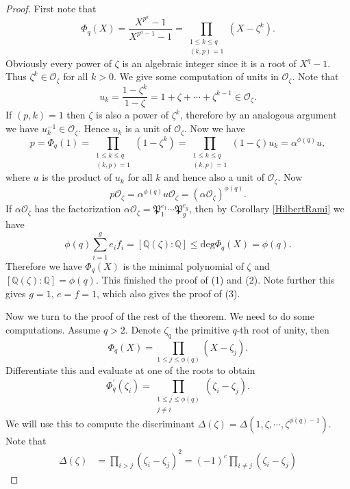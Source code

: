 \begin{proof}
First note that 
$$
\Phi _q\left( X \right) =\frac{X^{p^a}-1}{X^{p^a-1}-1}=\prod_{\substack{1\le k\le q \\ (k,p)=1}}{\left( X-\zeta ^k \right)}.
$$
Obviously every power of $\zeta$ is an algebraic integer since it is a root of $X^q-1$. Thus $\zeta^k\in\mathcal{O}_\zeta$ for all $k>0$. We give some computation of units in $\mathcal{O}_\zeta$. Note that 
$$
u_k=\frac{1-\zeta ^k}{1-\zeta}=1+\zeta +\cdots +\zeta ^{k-1}\in \mathcal{O} _{\zeta}.
$$
If $(p,k)=1$ then $\zeta$ is also a power of $\zeta^k$, therefore by an analogous argument we have $u_k^{-1}\in\mathcal{O}_\zeta$. Hence $u_k$ is a unit of $\mathcal{O}_\zeta$. Now we have 
$$
p=\Phi _q\left( 1 \right) =\prod_{\substack{1\le k\le q \\ (k,p)=1}}{\left( 1-\zeta ^k \right)}=\prod_{\substack{1\le k\le q \\ (k,p)=1}}{\left( 1-\zeta \right) u_k}=\alpha ^{\phi \left( q \right)}u,
$$
where $u$ is the product of $u_k$ for all $k$ and hence also a unit of $\mathcal{O}_\zeta$. Now 
$$
p\mathcal{O} _{\zeta}=\alpha ^{\phi \left( q \right)}u\mathcal{O} _{\zeta}=\left( \alpha \mathcal{O} _{\zeta} \right) ^{\phi \left( q \right)}.
$$
If $\alpha\mathcal{O}_\zeta$ has the factorization $\alpha \mathcal{O} _{\zeta}=\mathfrak{P} _{1}^{e_1}\cdots \mathfrak{P} _{g}^{e_g}$, then by Corollary \ref{HilbertRami} we have 
$$
\phi \left( q \right) \sum_{i=1}^g{e_if_i}=\left[ \mathbb{Q} \left( \zeta \right) :\mathbb{Q} \right] \le \mathrm{deg}\Phi _q\left( X \right) =\phi \left( q \right) .
$$
Therefore we have $\Phi_q(X)$ is the minimal polynomial of $\zeta$ and $[\mathbb{Q}(\zeta):\mathbb{Q}]=\phi(q)$. This finished the proof of (1) and (2). Note further this gives $g=1$, $e=f=1$, which also gives the proof of (3).\par
Now we turn to the proof of the rest of the theorem. We need to do some computations. Assume $q>2$. Denote $\zeta_q$ the primitive $q$-th root of unity, then 
$$
\Phi _q\left( X \right) =\prod_{1\le j\le \phi \left( q \right)}{\left( X-\zeta _j \right)}.
$$
Differentiate this and evaluate at one of the roots to obtain 
$$
\Phi _{q}^{\prime}\left( \zeta _i \right) =\prod_{\substack{1\le j\le \phi \left( q \right) \\ j\ne i}}{\left( \zeta _i-\zeta _j \right)}.
$$
We will use this to compute the discriminant $\Delta(\zeta)=\Delta(1,\zeta,\cdots,\zeta^{\phi(q)-1})$. Note that 
$$
\begin{aligned}
\Delta \left( \zeta \right) &=\prod_{i>j}{\left( \zeta _i-\zeta _j \right) ^2}=\left( -1 \right) ^c\prod_{i\ne j}{\left( \zeta _i-\zeta _j \right)}

\end{aligned}$$
\end{proof}
